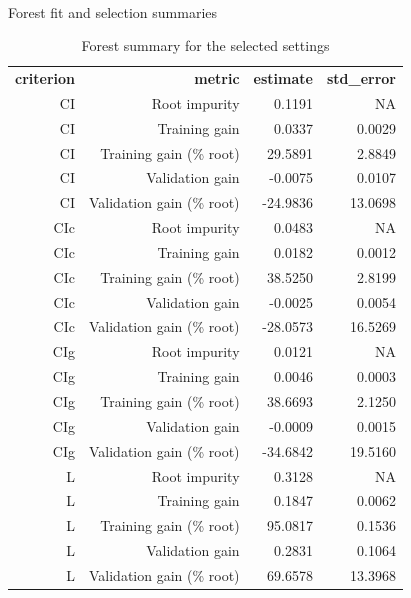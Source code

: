 \documentclass[
  11pt,
  a4paper,
]{article}
\makeatletter
\let\oldparagraph\paragraph
\renewcommand{\paragraph}{
    \@ifstar
      \xxxParagraphStar
      \xxxParagraphNoStar
  }
\newcommand{\xxxParagraphStar}[1]{\oldparagraph*{#1}\mbox{}}
\newcommand{\xxxParagraphNoStar}[1]{\oldparagraph{#1}\mbox{}}
\makeatother
\begin{document}
\endgroup{}

\paragraph{Forest fit and selection
summaries}\label{forest-fit-and-selection-summaries}

\begingroup\fontsize{11}{13}\selectfont

\begin{longtable}[t]{rrrr}

\caption{\label{tbl-appendix-forest-selected-setting-summary}Forest
summary for the selected settings}

\tabularnewline

\\
\toprule
\textbf{criterion} & \textbf{metric} & \textbf{estimate} & \textbf{std\_error}\\
\midrule
CI & Root impurity & 0.1191 & NA\\
CI & Training gain & 0.0337 & 0.0029\\
CI & Training gain (\% root) & 29.5891 & 2.8849\\
CI & Validation gain & -0.0075 & 0.0107\\
CI & Validation gain (\% root) & -24.9836 & 13.0698\\
\addlinespace
CIc & Root impurity & 0.0483 & NA\\
CIc & Training gain & 0.0182 & 0.0012\\
CIc & Training gain (\% root) & 38.5250 & 2.8199\\
CIc & Validation gain & -0.0025 & 0.0054\\
CIc & Validation gain (\% root) & -28.0573 & 16.5269\\
\addlinespace
CIg & Root impurity & 0.0121 & NA\\
CIg & Training gain & 0.0046 & 0.0003\\
CIg & Training gain (\% root) & 38.6693 & 2.1250\\
CIg & Validation gain & -0.0009 & 0.0015\\
CIg & Validation gain (\% root) & -34.6842 & 19.5160\\
\addlinespace
L & Root impurity & 0.3128 & NA\\
L & Training gain & 0.1847 & 0.0062\\
L & Training gain (\% root) & 95.0817 & 0.1536\\
L & Validation gain & 0.2831 & 0.1064\\
L & Validation gain (\% root) & 69.6578 & 13.3968\\
\bottomrule

\end{longtable}
\end{document}
